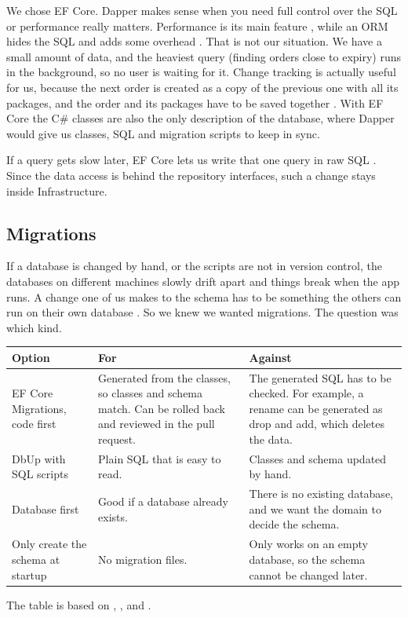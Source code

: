 \documentclass[a4paper,11pt]{article}
\begin{document}
We chose EF Core. Dapper makes sense when you need full control over the SQL or performance really matters. Performance is its main feature \cite{dapperlib-dapper}, while an ORM hides the SQL and adds some overhead \cite[sec.~4.3.1]{desanctis-web-apis-aspnet-core}. That is not our situation. We have a small amount of data, and the heaviest query (finding orders close to expiry) runs in the background, so no user is waiting for it. Change tracking is actually useful for us, because the next order is created as a copy of the previous one with all its packages, and the order and its packages have to be saved together \cite[sec.~4.3.4]{desanctis-web-apis-aspnet-core}. With EF Core the C\# classes are also the only description of the database, where Dapper would give us classes, SQL and migration scripts to keep in sync.

If a query gets slow later, EF Core lets us write that one query in raw SQL \cite{microsoft-efcore-sql-queries}. Since the data access is behind the repository interfaces, such a change stays inside Infrastructure.

\subsection{Migrations}
If a database is changed by hand, or the scripts are not in version control, the databases on different machines slowly drift apart and things break when the app runs. A change one of us makes to the schema has to be something the others can run on their own database \cite{dbup-philosophy}. So we knew we wanted migrations. The question was which kind.
\begin{center}
\begin{tabular}{@{}p{3.1cm} p{5.6cm} p{5.6cm}@{}}
\textbf{Option} & \textbf{For} & \textbf{Against} \\
\hline
EF Core Migrations, code first & Generated from the classes, so classes and schema match. Can be rolled back and reviewed in the pull request. & The generated SQL has to be checked. For example, a rename can be generated as drop and add, which deletes the data. \\
\hline
DbUp with SQL scripts & Plain SQL that is easy to read. & Classes and schema updated by hand. \\
\hline
Database first & Good if a database already exists. & There is no existing database, and we want the domain to decide the schema. \\
\hline
Only create the schema at startup & No migration files. & Only works on an empty database, so the schema cannot be changed later. \\
\hline
\end{tabular}
\end{center}
The table is based on \cite[secs.~4.3.2 and 4.3.5]{desanctis-web-apis-aspnet-core}, \cite{microsoft-efcore-managing-migrations}, \cite{microsoft-efcore-create-drop-apis} and \cite{dbup-docs}.
\end{document}
